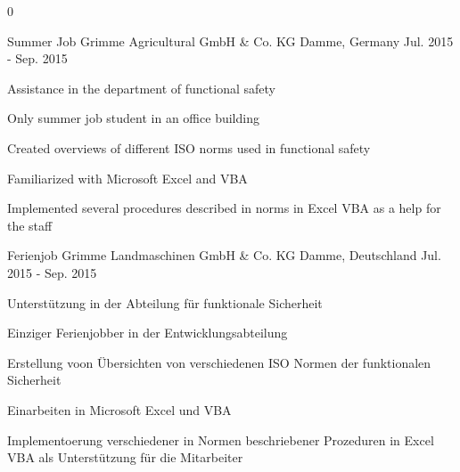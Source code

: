 \begin{cventries}
\multilang
  {0}
  {\cventry
    {Summer Job} %
    {Grimme Agricultural GmbH \& Co. KG} %
    {Damme, Germany} %
    {Jul. 2015 - Sep. 2015} %
    {
      \begin{cvitems} %
        \item {Assistance in the department of functional safety}
        \item {Only summer job student in an office building}
        \item {Created overviews of different ISO norms used in functional safety}
        \item {Familiarized with Microsoft Excel and VBA}
        \item {Implemented several procedures described in norms in Excel VBA as a help for the staff}
      \end{cvitems}
    }
  }{
    {Ferienjob} %
    {Grimme Landmaschinen GmbH \& Co. KG} %
    {Damme, Deutschland} %
    {Jul. 2015 - Sep. 2015} %
    {
      \begin{cvitems} %
        \item {Unterstützung in der Abteilung für funktionale Sicherheit}
        \item {Einziger Ferienjobber in der Entwicklungsabteilung}
        \item {Erstellung voon Übersichten von verschiedenen ISO Normen der funktionalen Sicherheit}
        \item {Einarbeiten in Microsoft Excel und VBA}
        \item {Implementoerung verschiedener in Normen beschriebener Prozeduren in Excel VBA als Unterstützung für die Mitarbeiter}
      \end{cvitems}
    }
  }
  
\end{cventries}
